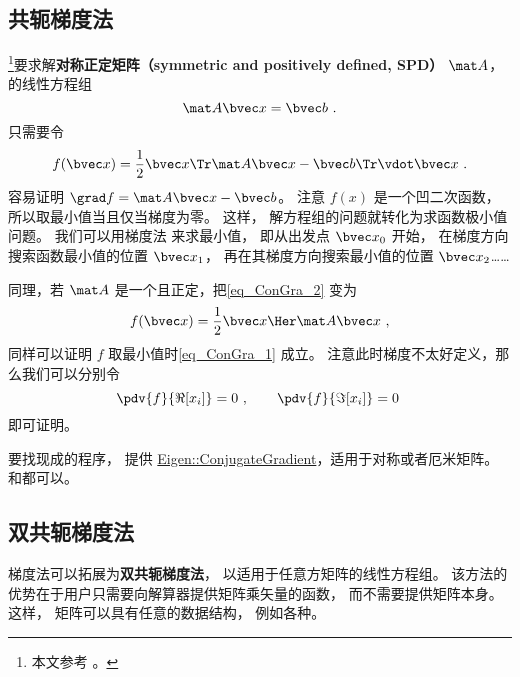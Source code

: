 
\begin{issues}
\issueDraft
\end{issues}


\subsection{共轭梯度法}

\footnote{本文参考 \cite{NR3}。}要求解\textbf{对称正定矩阵（symmetric and positively defined, SPD）} $\mat A$， 的线性方程组
\begin{equation}\label{eq_ConGra_1}
\mat A \bvec x = \bvec b~.
\end{equation}
只需要令
\begin{equation}\label{eq_ConGra_2}
f(\bvec x) = \frac{1}{2}\bvec x\Tr \mat A\bvec x - \bvec b\Tr \vdot \bvec x~.
\end{equation}
容易证明 $\grad f = \mat A \bvec x - \bvec b$。 注意 $f(x)$ 是一个凹二次函数， 所以取最小值当且仅当梯度为零。 这样， 解方程组的问题就转化为求函数极小值问题。 我们可以用梯度法%
来求最小值， 即从出发点 $\bvec x_0$ 开始， 在梯度方向搜索函数最小值的位置 $\bvec x_1$， 再在其梯度方向搜索最小值的位置 $\bvec x_2$……

同理，若 $\mat A$ 是一个且正定，把\autoref{eq_ConGra_2} 变为
\begin{equation}
f(\bvec x) = \frac{1}{2}\bvec x\Her \mat A \bvec x~,
\end{equation}
同样可以证明 $f$ 取最小值时\autoref{eq_ConGra_1} 成立。 注意此时梯度不太好定义，那么我们可以分别令
\begin{equation}
\pdv{f}{\Re[x_i]} = 0~, \qquad  \pdv{f}{\Im[x_i]} = 0~
\end{equation}
即可证明。

要找现成的程序，  提供 \href{https://eigen.tuxfamily.org/dox/classEigen_1_1ConjugateGradient.html}{Eigen::ConjugateGradient}，适用于对称或者厄米矩阵。和都可以。

\subsection{双共轭梯度法}

梯度法可以拓展为\textbf{双共轭梯度法}， 以适用于任意方矩阵的线性方程组。 该方法的优势在于用户只需要向解算器提供矩阵乘矢量的函数， 而不需要提供矩阵本身。 这样， 矩阵可以具有任意的数据结构， 例如各种。

